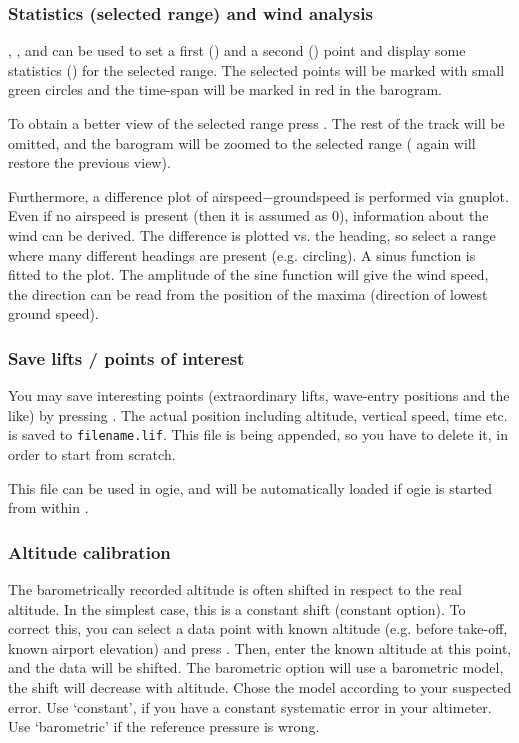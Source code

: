 \subsubsection{Statistics (selected range) and wind analysis}
, , and  can be used to set a first () and a second () point and
display some statistics () for the selected range. The selected points will be
marked with small green circles and the time-span will be marked in red in the barogram.

To obtain a better view of the selected range press . The rest of the track will be omitted, and the
barogram will be zoomed to the selected range ( again will restore the previous view).

Furthermore, a difference plot of airspeed$-$groundspeed is performed via gnuplot. Even if no airspeed is present
(then it is assumed as 0), information about the wind can be derived. The difference is plotted vs. the heading,
so select a range where many different headings are present (e.g. circling). A sinus function is fitted to the plot.
The amplitude of the sine function will give the wind speed, the direction can be read from the position of the maxima (direction of lowest ground speed).


\subsubsection{Save lifts / points of interest}
You may save interesting points (extraordinary lifts, wave-entry positions and the like) by pressing .
The actual position including altitude, vertical speed, time etc. is saved to \texttt{filename.lif}.
This file is being appended, so you have to delete it, in order to start from scratch.

This file can be used in ogie, and will be automatically loaded if ogie is started from within .


\subsubsection{Altitude calibration}
The barometrically recorded altitude is often shifted in respect to the real altitude.
In the simplest case, this is a constant shift (constant option).
To correct this, you can select a data point with known altitude
(e.g. before take-off, known airport elevation) and press .
Then, enter the known altitude at this point, and the data will be shifted.
The barometric option will use a barometric model, the shift will decrease with altitude.
Chose the model according to your suspected error. Use `constant', if you have a constant systematic error in your altimeter.
Use `barometric' if the reference pressure is wrong.

